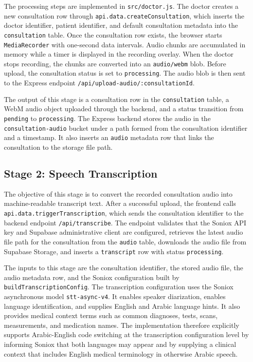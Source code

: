 The processing steps are implemented in \texttt{src/doctor.js}. The doctor creates a new consultation row through \texttt{api.data.createConsultation}, which inserts the doctor identifier, patient identifier, and default consultation metadata into the \texttt{consultation} table. Once the consultation row exists, the browser starts \texttt{MediaRecorder} with one-second data intervals. Audio chunks are accumulated in memory while a timer is displayed in the recording overlay. When the doctor stops recording, the chunks are converted into an \texttt{audio/webm} blob. Before upload, the consultation status is set to \texttt{processing}. The audio blob is then sent to the Express endpoint \texttt{/api/upload-audio/:consultationId}.

The output of this stage is a consultation row in the \texttt{consultation} table, a WebM audio object uploaded through the backend, and a status transition from \texttt{pending} to \texttt{processing}. The Express backend stores the audio in the \texttt{consultation-audio} bucket under a path formed from the consultation identifier and a timestamp. It also inserts an \texttt{audio} metadata row that links the consultation to the storage file path.

\subsection{Stage 2: Speech Transcription}
\label{subsec:stage-transcription}

The objective of this stage is to convert the recorded consultation audio into machine-readable transcript text. After a successful upload, the frontend calls \texttt{api.data.triggerTranscription}, which sends the consultation identifier to the backend endpoint \texttt{/api/transcribe}. The endpoint validates that the Soniox API key and Supabase administrative client are configured, retrieves the latest audio file path for the consultation from the \texttt{audio} table, downloads the audio file from Supabase Storage, and inserts a \texttt{transcript} row with status \texttt{processing}.

The inputs to this stage are the consultation identifier, the stored audio file, the audio metadata row, and the Soniox configuration built by \texttt{buildTranscriptionConfig}. The transcription configuration uses the Soniox asynchronous model \texttt{stt-async-v4}. It enables speaker diarization, enables language identification, and supplies English and Arabic language hints. It also provides medical context terms such as common diagnoses, tests, scans, measurements, and medication names. The implementation therefore explicitly supports Arabic-English code switching at the transcription configuration level by informing Soniox that both languages may appear and by supplying a clinical context that includes English medical terminology in otherwise Arabic speech.

